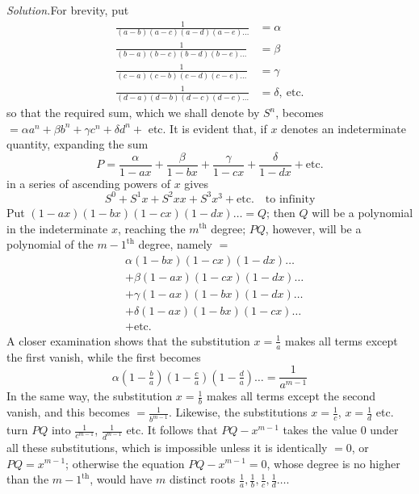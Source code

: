 \textit{Solution.}\quad For brevity, put
\[
\begin{aligned}
\frac1{(a-b)(a-c)(a-d)(a-e)\ldots}&=\alpha\\
\frac1{(b-a)(b-c)(b-d)(b-e)\ldots}&=\beta\\
\frac1{(c-a)(c-b)(c-d)(c-e)\ldots}&=\gamma\\
\frac1{(d-a)(d-b)(d-c)(d-e)\ldots}&=\delta,\ \text{etc.}
\end{aligned}
\]
so that the required sum, which we shall denote by $S^n$, becomes $=\alpha a^n+\beta b^n+\gamma c^n+\delta d^n+$ etc. It is evident that, if $x$ denotes an indeterminate quantity, expanding the sum
\[
P=\frac\alpha{1-ax}+\frac\beta{1-bx}+\frac\gamma{1-cx}+\frac\delta{1-dx}+\text{etc.}
\]
in a series of ascending powers of $x$ gives
\[
S^0+S^1x+S^2xx+S^3x^3+\text{etc.}\quad\text{to infinity}
\]
Put $(1-ax)(1-bx)(1-cx)(1-dx)\ldots=Q$; then $Q$ will be a polynomial in the indeterminate $x$, reaching the $m^{\mathrm{th}}$ degree; $PQ$, however, will be a polynomial of the $m-1^{\mathrm{th}}$ degree, namely $=$
\[
\begin{aligned}
&\alpha(1-bx)(1-cx)(1-dx)\ldots\\
&+\beta(1-ax)(1-cx)(1-dx)\ldots\\
&+\gamma(1-ax)(1-bx)(1-dx)\ldots\\
&+\delta(1-ax)(1-bx)(1-cx)\ldots\\
&+\text{etc.}
\end{aligned}
\]
A closer examination shows that the substitution $x=\frac1a$ makes all terms except the first vanish, while the first becomes
\[
\alpha(1-\tfrac ba)(1-\tfrac ca)(1-\tfrac da)\ldots=\frac1{a^{m-1}}
\]
In the same way, the substitution $x=\frac1b$ makes all terms except the second vanish, and this becomes $=\frac1{b^{m-1}}$. Likewise, the substitutions $x=\frac1c$, $x=\frac1d$ etc. turn $PQ$ into $\frac1{c^{m-1}}$, $\frac1{d^{m-1}}$ etc. It follows that $PQ-x^{m-1}$ takes the value 0 under all these substitutions, which is impossible unless it is identically $=0$, or $PQ=x^{m-1}$; otherwise the equation $PQ-x^{m-1}=0$, whose degree is no higher than the $m-1^{\mathrm{th}}$, would have $m$ distinct roots $\frac1a,\frac1b,\frac1c,\frac1d\ldots$.

